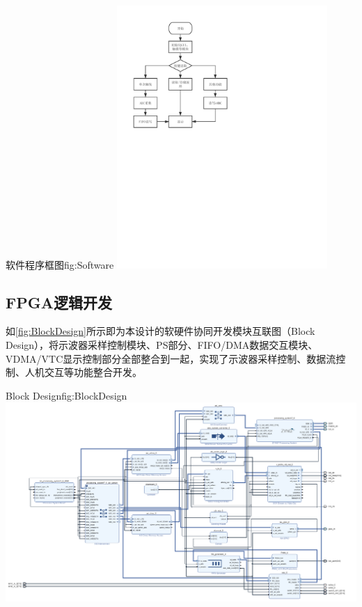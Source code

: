 \documentclass[supercite]{HustGraduPaper}
\begin{document}
	
	\begin{generalfig}[htb]{软件程序框图}{fig:Software}
		\includegraphics[width=8cm]{Figures/Software.pdf}
	\end{generalfig}

	
	\subsection{FPGA逻辑开发}
	如\autoref{fig:BlockDesign}所示即为本设计的软硬件协同开发模块互联图（Block Design），将示波器采样控制模块、PS部分、FIFO/DMA数据交互模块、VDMA/VTC显示控制部分全部整合到一起，实现了示波器采样控制、数据流控制、人机交互等功能整合开发。
	
	\begin{generalfig}[htb]{Block Design}{fig:BlockDesign}
		\includegraphics[width=\textwidth]{Figures/BlockDesign.png}
	\end{generalfig}
	
\end{document}

